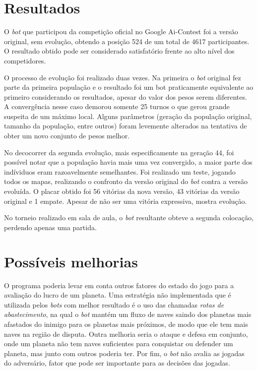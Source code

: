 \documentclass[a4paper,titlepage,11pt]{article}
\begin{document}
\section{Resultados}
O {\em bot} que participou da competição oficial no Google Ai-Contest foi a versão original, sem evolução, obtendo a posição 524 de um total de 4617 participantes. O resultado obtido pode ser considerado satisfatório frente ao alto nível dos competidores.

O processo de evolução foi realizado duas vezes. Na primeira o {\em bot} original fez parte da primeira população e o resultado foi um bot praticamente equivalente ao primeiro considerando os resultados, apesar do valor dos pesos serem diferentes. A convergência nesse caso demorou somente 25 turnos o que gerou grande suspeita de um máximo local. Alguns parâmetros (geração da população original, tamanho da população, entre outros) foram levemente alterados na tentativa de obter um novo conjunto de pesos melhor.

No decocorrer da segunda evolução, mais especificamente na geração 44, foi possível notar que a população havia mais uma vez convergido, a maior parte dos indíviduos eram razoavelmente semelhantes. Foi realizado um teste, jogando todos os mapas, realizando o confronto da versão original do {\em bot} contra a versão evoluída. O placar obtido foi 56 vitórias da nova versão, 43 vitórias da versão original e 1 empate. Apesar de não ser uma vitória expressiva, mostra evolução.

No torneio realizado em sala de aula, o {\em bot} resultante obteve a segunda colocação, perdendo apenas uma partida.

\section{Possíveis melhorias}
O programa poderia levar em conta outros fatores do estado do jogo para a avaliação do lucro de um planeta. Uma estratégia não implementada que é utilizada pelos {\em bots} com melhor resultado é o uso das chamadas {\em rotas de abastecimento}, na qual o {\em bot} mantém um fluxo de naves saindo dos planetas mais afastados do inimigo para os planetas mais próximos, de modo que ele tem mais naves na região de disputa. Outra melhoria seria o ataque e defesa em conjunto, onde um planeta não tem naves suficientes para conquistar ou defender um planeta, mas junto com outros poderia ter. Por fim, o {\em bot} não avalia as jogadas do adversário, fator que pode ser importante para as decisões das jogadas.
\end{document}
